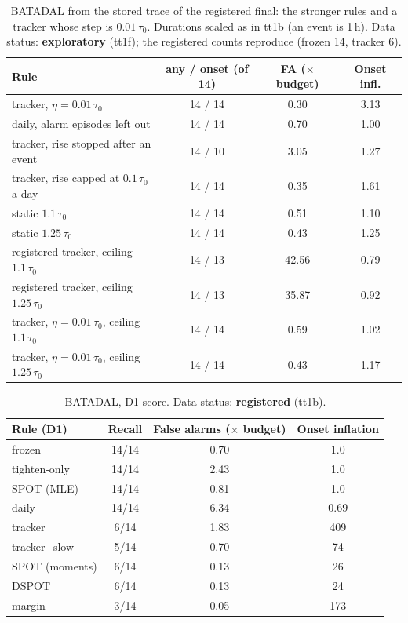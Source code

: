 \documentclass[sigconf]{acmart}
\begin{document}
\begin{table}[t]
\caption{BATADAL from the stored trace of the registered final: the stronger rules and a tracker whose
step is $0.01\,\tau_0$. Durations scaled as in tt1b (an event is 1\,h). Data status: \textbf{exploratory}
(tt1f); the registered counts reproduce (frozen 14, tracker 6).}
\label{tab:batadalstrong}
\small
\begin{tabularx}{\columnwidth}{@{}Lccc@{}}
\toprule
Rule & any / onset (of 14) & FA ($\times$ budget) & Onset infl. \\
\midrule
tracker, $\eta = 0.01\,\tau_0$ & 14 / 14 & 0.30 & 3.13 \\
daily, alarm episodes left out & 14 / 14 & 0.70 & 1.00 \\
tracker, rise stopped after an event & 14 / 10 & 3.05 & 1.27 \\
tracker, rise capped at $0.1\,\tau_0$ a day & 14 / 14 & 0.35 & 1.61 \\
static $1.1\,\tau_0$ & 14 / 14 & 0.51 & 1.10 \\
static $1.25\,\tau_0$ & 14 / 14 & 0.43 & 1.25 \\
registered tracker, ceiling $1.1\,\tau_0$ & 14 / 13 & 42.56 & 0.79 \\
registered tracker, ceiling $1.25\,\tau_0$ & 14 / 13 & 35.87 & 0.92 \\
tracker, $\eta = 0.01\,\tau_0$, ceiling $1.1\,\tau_0$ & 14 / 14 & 0.59 & 1.02 \\
tracker, $\eta = 0.01\,\tau_0$, ceiling $1.25\,\tau_0$ & 14 / 14 & 0.43 & 1.17 \\
\bottomrule
\end{tabularx}
\end{table}

\begin{table}[t]
\caption{BATADAL, D1 score. Data status: \textbf{registered} (tt1b).}
\label{tab:batadal}
\begin{tabularx}{\columnwidth}{@{}lCCC@{}}
\toprule
Rule (D1) & Recall & False alarms ($\times$ budget) & Onset inflation \\
\midrule
frozen & 14/14 & 0.70 & 1.0 \\
tighten-only & 14/14 & 2.43 & 1.0 \\
SPOT (MLE) & 14/14 & 0.81 & 1.0 \\
daily & 14/14 & 6.34 & 0.69 \\
tracker & 6/14 & 1.83 & 409 \\
tracker\_slow & 5/14 & 0.70 & 74 \\
SPOT (moments) & 6/14 & 0.13 & 26 \\
DSPOT & 6/14 & 0.13 & 24 \\
margin & 3/14 & 0.05 & 173 \\
\bottomrule
\end{tabularx}
\end{table}
\end{document}
